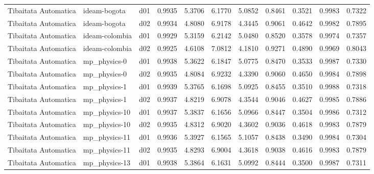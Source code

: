 \begin{longtable}{lllrrrrrrrr}
 Tibaitata Automatica  &          ideam-bogota &     d01 &   0.9935 &   5.3706 &   6.1770 &       5.0852 &        0.8461 &       0.3521 &           0.9983 &  0.7322 \\
 Tibaitata Automatica  &          ideam-bogota &     d02 &   0.9934 &   4.8080 &   6.9178 &       4.3445 &        0.9061 &       0.4642 &           0.9982 &  0.7895 \\
 Tibaitata Automatica  &        ideam-colombia &     d01 &   0.9929 &   5.3159 &   6.2142 &       5.0480 &        0.8520 &       0.3578 &           0.9974 &  0.7357 \\
 Tibaitata Automatica  &        ideam-colombia &     d02 &   0.9925 &   4.6108 &   7.0812 &       4.1810 &        0.9271 &       0.4890 &           0.9969 &  0.8043 \\
 Tibaitata Automatica  &          mp\_physics-0 &     d01 &   0.9938 &   5.3622 &   6.1847 &       5.0775 &        0.8470 &       0.3533 &           0.9987 &  0.7330 \\
 Tibaitata Automatica  &          mp\_physics-0 &     d02 &   0.9935 &   4.8084 &   6.9232 &       4.3390 &        0.9060 &       0.4650 &           0.9984 &  0.7898 \\
 Tibaitata Automatica  &          mp\_physics-1 &     d01 &   0.9939 &   5.3765 &   6.1698 &       5.0925 &        0.8455 &       0.3510 &           0.9988 &  0.7318 \\
 Tibaitata Automatica  &          mp\_physics-1 &     d02 &   0.9937 &   4.8219 &   6.9078 &       4.3544 &        0.9046 &       0.4627 &           0.9985 &  0.7886 \\
 Tibaitata Automatica  &         mp\_physics-10 &     d01 &   0.9937 &   5.3837 &   6.1656 &       5.0966 &        0.8447 &       0.3504 &           0.9986 &  0.7312 \\
 Tibaitata Automatica  &         mp\_physics-10 &     d02 &   0.9935 &   4.8312 &   6.9020 &       4.3602 &        0.9036 &       0.4618 &           0.9983 &  0.7879 \\
 Tibaitata Automatica  &         mp\_physics-11 &     d01 &   0.9936 &   5.3927 &   6.1565 &       5.1057 &        0.8438 &       0.3490 &           0.9984 &  0.7304 \\
 Tibaitata Automatica  &         mp\_physics-11 &     d02 &   0.9935 &   4.8293 &   6.9004 &       4.3618 &        0.9038 &       0.4616 &           0.9983 &  0.7879 \\
 Tibaitata Automatica  &         mp\_physics-13 &     d01 &   0.9938 &   5.3864 &   6.1631 &       5.0992 &        0.8444 &       0.3500 &           0.9987 &  0.7311 \\

\end{longtable}

